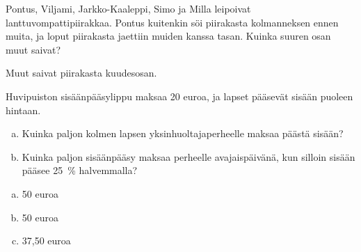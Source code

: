 \begin{tehtavasivu}
    
    \begin{tehtava} %
        Pontus, Viljami, Jarkko-Kaaleppi, Simo ja Milla leipoivat lanttuvompattipiirakkaa.
        Pontus kuitenkin söi piirakasta kolmanneksen ennen muita, ja loput piirakasta
        jaettiin muiden kanssa tasan. Kuinka suuren osan muut saivat?
        
        \begin{vastaus}
            Muut saivat piirakasta kuudesosan.
        \end{vastaus}
    \end{tehtava}
    
    \begin{tehtava} %
        Huvipuiston sisäänpääsylippu maksaa 20 euroa, ja lapset pääsevät
        sisään puoleen hintaan.
	\begin{enumerate}[a)]
		\item Kuinka paljon kolmen lapsen yksinhuoltajaperheelle maksaa päästä sisään?
		\item Kuinka paljon sisäänpääsy maksaa perheelle avajaispäivänä,
		kun silloin sisään pääsee 25~\% halvemmalla?
        \end{enumerate}
        \begin{vastaus}
	\begin {enumerate}[a)]
         \item 50 euroa 
           \item 50 euroa 
	\item 37,50 euroa
\end{enumerate} 
       \end{vastaus}
    \end{tehtava}  
  

\end{tehtavasivu}
